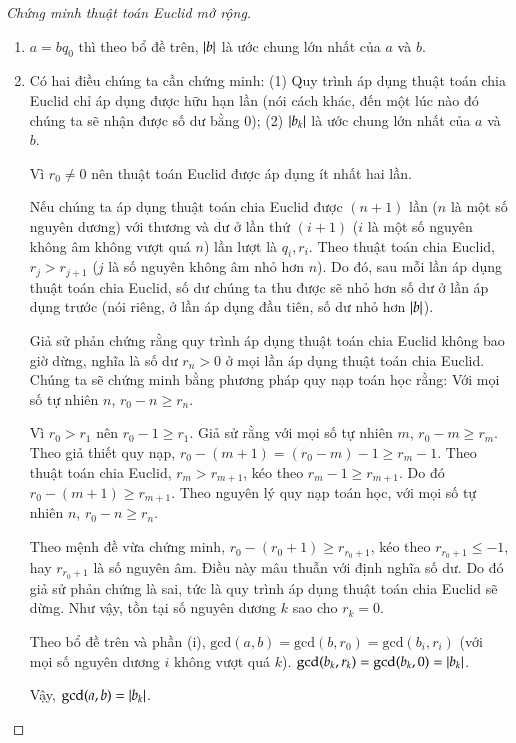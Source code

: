 \begin{proof}[Chứng minh thuật toán Euclid mở rộng]
    \begin{enumerate}[label={(\roman*)}]
        \item $a = b q_{0}$ thì theo bổ đề trên, $\left\vert{b}\right\vert$ là ước chung lớn nhất của $a$ và $b$.

        \item Có hai điều chúng ta cần chứng minh: (1) Quy trình áp dụng thuật toán chia Euclid chỉ áp dụng được hữu hạn lần (nói cách khác, đến một lúc nào đó chúng ta sẽ nhận được số dư bằng $0$); (2) $\left\vert{b_{k}}\right\vert$ là ước chung lớn nhất của $a$ và $b$.

              Vì $r_{0}\ne 0$ nên thuật toán Euclid được áp dụng ít nhất hai lần.

              Nếu chúng ta áp dụng thuật toán chia Euclid được $(n+1)$ lần ($n$ là một số nguyên dương) với thương và dư ở lần thứ $(i+1)$ ($i$ là một số nguyên không âm không vượt quá $n$) lần lượt là $q_{i}, r_{i}$. Theo thuật toán chia Euclid, $r_{j} > r_{j+1}$ ($j$ là số nguyên không âm nhỏ hơn $n$). Do đó, sau mỗi lần áp dụng thuật toán chia Euclid, số dư chúng ta thu được sẽ nhỏ hơn số dư ở lần áp dụng trước (nói riêng, ở lần áp dụng đầu tiên, số dư nhỏ hơn $\left\vert{b}\right\vert$).

              Giả sử phản chứng rằng quy trình áp dụng thuật toán chia Euclid không bao giờ dừng, nghĩa là số dư $r_{n} > 0$ ở mọi lần áp dụng thuật toán chia Euclid. Chúng ta sẽ chứng minh bằng phương pháp quy nạp toán học rằng: Với mọi số tự nhiên $n$, $r_{0} - n\geq r_{n}$.

              Vì $r_{0} > r_{1}$ nên $r_{0} - 1\geq r_{1}$. Giả sử rằng với mọi số tự nhiên $m$, $r_{0} - m\geq r_{m}$. Theo giả thiết quy nạp, $r_{0} - (m + 1) = (r_{0} - m) - 1 \geq r_{m} - 1$. Theo thuật toán chia Euclid, $r_{m} > r_{m+1}$, kéo theo $r_{m} - 1\geq r_{m+1}$. Do đó $r_{0} - (m + 1)\geq r_{m+1}$. Theo nguyên lý quy nạp toán học, với mọi số tự nhiên $n$, $r_{0} - n\geq r_{n}$.

              Theo mệnh đề vừa chứng minh, $r_{0} - (r_{0} + 1)\geq r_{r_{0} + 1}$, kéo theo $r_{r_{0} + 1}\leq -1$, hay $r_{r_{0} + 1}$ là số nguyên âm. Điều này mâu thuẫn với định nghĩa số dư. Do đó giả sử phản chứng là sai, tức là quy trình áp dụng thuật toán chia Euclid sẽ dừng. Như vậy, tồn tại số nguyên dương $k$ sao cho $r_{k} = 0$.

              Theo bổ đề trên và phần (i), $\text{gcd}(a, b) = \text{gcd}(b, r_{0}) = \text{gcd}(b_{i}, r_{i})$ (với mọi số nguyên dương $i$ không vượt quá $k$). $\text{gcd}(b_{k}, r_{k}) = \text{gcd}(b_{k}, 0) = \left\vert{b_{k}}\right\vert$.

              Vậy, $\text{gcd}(a, b) = \left\vert{b_{k}}\right\vert$.
    \end{enumerate}
\end{proof}

